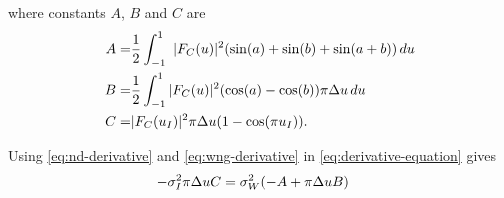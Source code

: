 where constants $A$, $B$ and $C$ are
\begin{align*}
  A =& \frac{1}{2}\int_{-1}^{1} \
     |F_C(u)|^2(\sin(a) + \sin(b) + \sin(a+b))\, du \\
  B =& \frac{1}{2}\int_{-1}^{1} |F_C(u)|^2(\cos(a)-\cos(b))\pi\Delta u \, du \\
  C =& |F_C(u_I)|^2\pi\Delta u(1 - \cos(\pi u_I)).
\end{align*}

Using \eqref{eq:nd-derivative} and \eqref{eq:wng-derivative} in \eqref{eq:derivative-equation} gives
\begin{align}
  \label{eq:1}
  -\sigma_I^2 \pi\Delta u C &=  \sigma^2_W (-A + \pi\Delta u B)
\end{align}

